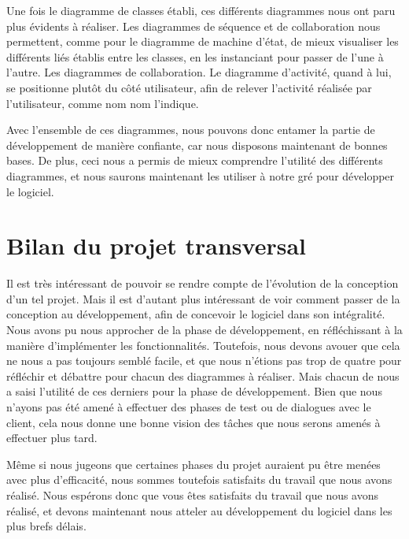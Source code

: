 \documentclass[letter, 11pt] {article}
\begin{document}
	Une fois le diagramme de classes établi, ces différents diagrammes nous ont paru plus évidents à réaliser. Les diagrammes de séquence et de collaboration nous permettent, comme pour le diagramme de machine d'état, de mieux visualiser les différents liés établis entre les classes, en les instanciant pour passer de l'une à l'autre. Les diagrammes de collaboration. Le diagramme d'activité, quand à lui, se positionne plutôt du côté utilisateur, afin de relever l'activité réalisée par l'utilisateur, comme nom nom l'indique. 
	
	Avec l'ensemble de ces diagrammes, nous pouvons donc entamer la partie de développement de manière confiante, car nous disposons maintenant de bonnes bases. De plus, ceci nous a permis de mieux comprendre l'utilité des différents diagrammes, et nous saurons maintenant les utiliser à notre gré pour développer le logiciel.
	
	\section{Bilan du projet transversal}
	
	Il est très intéressant de pouvoir se rendre compte de l'évolution de la conception d'un tel projet. Mais il est d'autant plus intéressant de voir comment passer de la conception au développement, afin de concevoir le logiciel dans son intégralité. Nous avons pu nous approcher de la phase de développement, en réfléchissant à la manière d'implémenter les fonctionnalités. Toutefois, nous devons avouer que cela ne nous a pas toujours semblé facile, et que nous n'étions pas trop de quatre pour réfléchir et débattre pour chacun des diagrammes à réaliser. Mais chacun de nous a saisi l'utilité de ces derniers pour la phase de développement. Bien que nous n'ayons pas été amené à effectuer des phases de test ou de dialogues avec le client, cela nous donne une bonne vision des tâches que nous serons amenés à effectuer plus tard. 
	
	Même si nous jugeons que certaines phases du projet auraient pu être menées avec plus d'efficacité, nous sommes toutefois satisfaits du travail que nous avons réalisé. Nous espérons donc que vous êtes satisfaits du travail que nous avons réalisé, et devons maintenant nous atteler au développement du logiciel dans les plus brefs délais.
		
\end{document}
